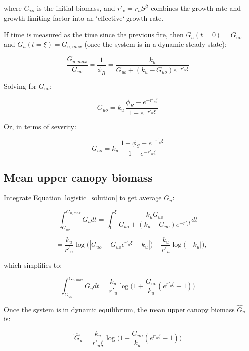 \documentclass{article}
\begin{document}
where  $G_{uo}$  is the initial biomass, and $r'_u =  r_u S^\beta  $  combines the growth rate and growth-limiting factor into an `effective` growth rate.

If time is measured as the time since the previous fire, then $G_u(t = 0) = G_{uo}$ and  $G_u(t = \xi) = G_{u,max}$  (once the system is in a dynamic steady state):

\begin{equation}
    \frac{G_{u,max}}{G_{uo}} = \frac{1}{\phi_R} =  \frac{k_u }{G_{uo} +(k_u-G_{uo}) e^{-r'_u \xi}}
\end{equation}

 Solving for $G_{uo}$:

\begin{equation}
  G_{uo} =  k_u \  \frac{\phi_R - e^{-r'_u \xi} }{1 - e^{-r'_u \xi}}
\end{equation}

Or, in terms of severity:

\begin{equation}
  G_{uo} =  k_u \   \frac{1- \phi_S - e^{-r'_u \xi} }{1 - e^{-r'_u \xi}}
  \label{G_uo}
\end{equation}

\subsection*{Mean upper canopy biomass}

Integrate Equation \ref{logistic_solution} to get average $G_u$:

\begin{equation*}
 \int_{G_{uo}}^{G_{u,max}} G_u dt =
 \int_{0}^\xi \frac{k_u G_{uo}}{G_{uo} +(k_u-G_{uo}) e^{- r'_u t}}dt
\end{equation*}

\begin{equation*}
 \quad  =\frac{k_u}{r'_u}\log \big(| G_{uo} - G_{uo} e^{r'_u\xi}  - k_u | \big)
  - \frac{k_u}{r'_u}\log \big(|  - k_u | \big),
\end{equation*}


which simplifies to:

\begin{equation*}
 \int_{G_{uo}}^{G_{u,max}} G_u dt =
 		 \frac{k_u}{r'_u}\log \big(1 + \frac{G_{uo}}{k_u}( e^{r'_u \xi}-1)\big)
\end{equation*}

Once the system is in dynamic equilibrium, the mean upper canopy biomass $\hat G_u$ is:

\begin{equation}
\hat{G}_u =
 		 \frac{k_u}{r'_u \xi}\log \bigg(1 + \frac{G_{uo}}{k_u}( e^{r'_u \xi}-1)\bigg)
\end{equation}
\end{document}
